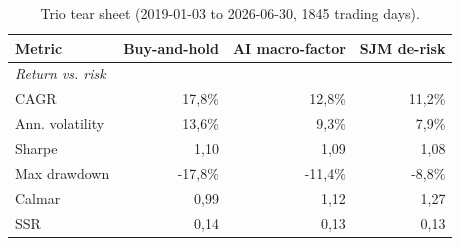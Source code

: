 \begin{table}[htbp]
  \centering
  \caption{Trio tear sheet (2019-01-03 to 2026-06-30, 1845 trading days).}
  \label{tab:tearsheet-paper-de}
  \begin{tabular}{lrrr}
    \toprule
    Metric & Buy-and-hold & AI macro-factor & SJM de-risk \\
    \midrule
    \multicolumn{4}{l}{\textit{Return vs. risk}} \\
    CAGR & 17,8\% & 12,8\% & 11,2\% \\
    Ann. volatility & 13,6\% & 9,3\% & 7,9\% \\
    Sharpe & 1,10 & 1,09 & 1,08 \\
    Max drawdown & -17,8\% & -11,4\% & -8,8\% \\
    Calmar & 0,99 & 1,12 & 1,27 \\
    SSR & 0,14 & 0,13 & 0,13 \\
    \bottomrule
  \end{tabular}
\end{table}
